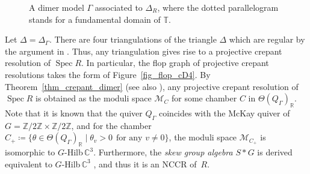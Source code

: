 \documentclass[pdftex]{sigma}
\numberwithin{equation}{section}
\theoremstyle{definition}
\newcommand{\ZZ}{\mathbb{Z}}
\newcommand{\RR}{\mathbb{R}}
\newcommand{\CC}{\mathbb{C}}
\newcommand{\TT}{\mathbb{T}}
\newcommand{\calM}{\mathcal{M}}
\newcommand{\Spec}{\operatorname{Spec}}
\begin{document}
\begin{figure}[!ht]\centering
{}
\vspace{-2mm}

\caption{A dimer model $\Gamma$ associated to $\Delta_R$, where the dotted parallelogram stands for a fundamental domain of $\TT$.}
\label{fig_dimer_cD4}
\end{figure}

Let $\Delta=\Delta_\Gamma$.
There are four triangulations of the triangle $\Delta$ which are regular by the argument in \cite[Section~3]{dais2001all}.
Thus, any triangulation gives rise to a projective crepant resolution of $\Spec R$.
In particular, the flop graph of projective crepant resolutions takes the form of Figure~\ref{fig_flop_cD4}.
By Theorem~\ref{thm_crepant_dimer} (see also \cite[Theorem~1.1]{CrawIshii}), any projective crepant resolution of $\Spec R$ is obtained as
the moduli space $\calM_C$ for some chamber $C$ in $\Theta(Q_\Gamma)_\RR$.
Note that it is known that the quiver $Q_\Gamma$ coincides with the McKay quiver of $G=\ZZ/2\ZZ\times \ZZ/2\ZZ$, and for the chamber
$C_+\coloneqq\{\theta\in\Theta(Q_\Gamma)_\RR \mid \theta_v>0 \hspace{5pt} \text{for any $v\neq0$}\}$,
the moduli space $\calM_{C_+}$ is isomorphic to {\rm $G$-Hilb\,$\CC^3$}.
Furthermore, the \emph{skew group algebra} $S*G$ is derived equivalent to {\rm $G$-Hilb\,$\CC^3$} \cite[Theorem~1.2]{BKR}, and thus it is an NCCR of~$R$.
\end{document}
